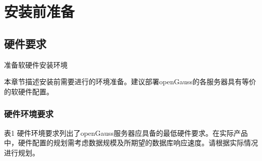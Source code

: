 \documentclass[12pt,UTF8]{ctexbook}
\begin{document}
\chapter{安装前准备}

\section{硬件要求}

准备软硬件安装环境

本章节描述安装前需要进行的环境准备。建议部署openGauss的各服务器具有等价的软硬件配置。

\subsection{硬件环境要求}

表1 硬件环境要求列出了openGauss服务器应具备的最低硬件要求。在实际产品中，硬件配置的规划需考虑数据规模及所期望的数据库响应速度。请根据实际情况进行规划。
\end{document}

